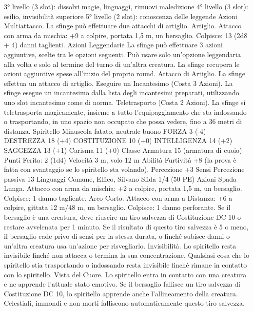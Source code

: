 \begin{multicols}{2}
3° livello (3 slot): dissolvi magie, linguaggi, rimuovi maledizione
4° livello (3 slot): esilio, invisibilità superiore
5° livello (2 slot): conoscenza delle leggende
Azioni
Multiattacco. La sfinge può effettuare due attacchi di artiglio.
Artiglio. Attacco con arma da mischia: +9 a colpire, portata 1,5
m, un bersaglio.
Colpisce: 13 (2d8 + 4) danni taglienti.
Azioni Leggendarie
La sfinge può effettuare 3 azioni aggiuntive, scelte tra le
opzioni seguenti. Può usare solo un’opzione leggendaria alla
volta e solo al termine del turno di un’altra creatura. La sfinge
recupera le azioni aggiuntive spese all’inizio del proprio round.
Attacco di Artiglio. La sfinge effettua un attacco di artiglio.
Eseguire un Incantesimo (Costa 3 Azioni). La sfinge esegue un
incantesimo dalla lista degli incantesimi preparati, utilizzando
uno slot incantesimo come di norma.
Teletrasporto (Costa 2 Azioni). La sfinge si teletrasporta
magicamente, insieme a tutto l’equipaggiamento che sta
indossando o trasportando, in uno spazio non occupato che possa
vedere, fino a 36 metri di distanza.
Spiritello
Minuscola fatato, neutrale buono
FORZA 3 (-4)
DESTREZZA 18 (+4)
COSTITUZIONE 10 (+0)
INTELLIGENZA 14 (+2)
SAGGEZZA 13 (+1)
Carisma 11 (+0)
Classe Armatura 15 (armatura di cuoio)
\hspace*{0pt}\hfill{Punti Ferita}: 2 (1d4)
Velocità 3 m, volo 12 m
Abilità Furtività +8 (la prova è fatta con svantaggio se lo
spiritello sta volando), Percezione +3
Sensi Percezione passiva 13
Linguaggi Comune, Elfico, Silvano
Sfida 1/4 (50 PE)
Azioni
Spada Lunga. Attacco con arma da mischia: +2 a colpire,
portata 1,5 m, un bersaglio.
Colpisce: 1 danno tagliente.
Arco Corto. Attacco con arma a Distanza: +6 a colpire, gittata
12 m/48 m, un bersaglio.
Colpisce: 1 danno perforante. Se il bersaglio è una creatura, deve
riuscire un tiro salvezza di Costituzione DC 10 o restare
avvelenata per 1 minuto. Se il risultato di questo tiro salvezza è 5
o meno, il bersaglio cade privo di sensi per la stessa durata, o
finché subisce danni o un’altra creatura usa un’azione per
risvegliarlo.
Invisibilità. Lo spiritello resta invisibile finché non attacca o
termina la sua concentrazione. Qualsiasi cosa che lo spiritello
stia trasportando o indossando resta invisibile finché rimane in
contatto con lo spiritello.
Vista del Cuore. Lo spiritello entra in contatto con una creatura e
ne apprende l’attuale stato emotivo. Se il bersaglio fallisce un
tiro salvezza di Costituzione DC 10, lo spiritello apprende anche
l’allineamento della creatura. Celestiali, immondi e non morti
falliscono automaticamente questo tiro salvezza.
 

\end{multicols}
